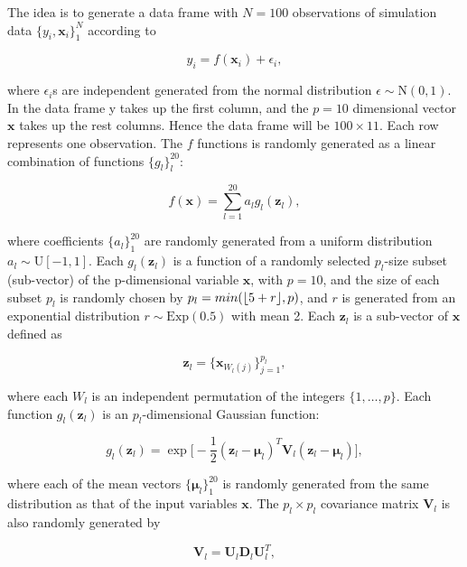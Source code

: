 \documentclass{article}
\DeclarePairedDelimiter\floor{\lfloor}{\rfloor}
\begin{document}
The idea is to generate a data frame with $N = 100$ observations of simulation data $\{y_i,\mathbf{x}_i\}^N_1$ according to

\begin{equation*}
y_i =f(\mathbf{x}_i)+\epsilon_i,
\end{equation*}

\noindent where $\epsilon_i$s are independent generated from the normal distribution
$\epsilon \sim \text{N}(0, 1)$. In the data frame y takes up the first column, and the $p =
10$ dimensional vector $\mathbf{x}$ takes up the rest columns. Hence the data frame will be
$100 \times 11$. Each row represents one observation. The $f$ functions is randomly
generated as a linear combination of functions $\{g_l\}_l^{20}$:

\begin{equation}
f(\mathbf{x}) = \sum_{l=1}^{20} a_l g_l (\mathbf{z}_l),
\end{equation}

\noindent where coefficients $\{a_l\}_1^{20}$ are randomly generated from a uniform
distribution $a_l \sim \text{U}[−1, 1]$. Each $g_l(\mathbf{z}_l)$ is a function of a randomly selected
$p_l$-size subset (sub-vector) of the p-dimensional variable $\mathbf{x}$, with $p = 10$, and
the size of each subset $p_l$ is randomly chosen by $p_l = min(\floor*{5 + r} ,
p)$, and $r$ 
is generated from an exponential distribution $r \sim \text{Exp}(0.5)$ with mean
2. Each $\mathbf{z}_l$ is a sub-vector of $\mathbf{x}$ defined as 

\begin{equation}
\mathbf{z}_l = \{\mathbf{x}_{W_l (j)}\}_{j=1}^{p_l},
\end{equation}

\noindent where each $W_l$ is an independent permutation of the integers $\{1,\ldots, p\}$.
Each function $g_l(\mathbf{z}_l)$ is an $p_l$-dimensional Gaussian function:

\begin{equation}
  g_l(\mathbf{z}_l) = \exp \bigg[ -\frac{1}{2} (\mathbf{z}_l-\pmb{\mu}_l)^T \mathbf{V}_l(\mathbf{z}_l-\pmb{\mu}_l) \bigg],
\end{equation}

\noindent where each of the mean vectors $\{\pmb{\mu}_l\}_1^{20}$ is randomly
generated from the same distribution as that of the input variables $\mathbf{x}$. The
$p_l \times p_l$ covariance matrix $\mathbf{V}_l$ is also randomly generated by

\begin{equation}
\mathbf{V}_l = \mathbf{U}_l\mathbf{D}_l\mathbf{U}^T_l ,
\end{equation}
\end{document}
